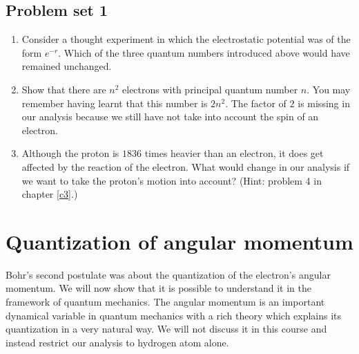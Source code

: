 \subsection{Problem set 1}
\begin{enumerate}
\item Consider a thought experiment in which the electrostatic potential was of
the form $e^{-r}$. Which of the three quantum numbers introduced above would 
have remained unchanged.
\item Show that there are $n^2$ electrons with principal quantum number $n$.
You may remember having learnt that this number is $2n^2$. The factor of $2$
is missing in our analysis because we still have not take into account the spin
of an electron.
\item Although the proton is $1836$ times heavier than an electron, it does get
affected by the reaction of the electron. What would change in our analysis if
we want to take the proton's motion into account? (Hint: problem 4 in chapter
\ref{c3}.)
\end{enumerate}

\section{Quantization of angular momentum}\label{c6s3}
Bohr's second postulate was about the quantization of the electron's angular 
momentum. We will now show that it is possible to understand it in the framework
of quantum mechanics. The angular momentum is an important dynamical variable
in quantum mechanics with a rich theory which explains its quantization in a
very natural way. We will not discuss it in this course and instead restrict
our analysis to hydrogen atom alone.


